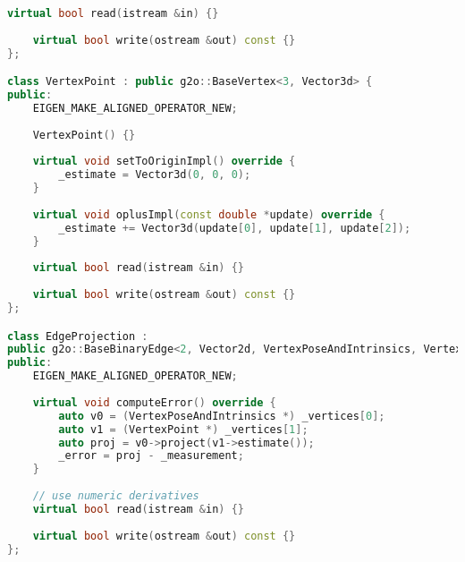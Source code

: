 \begin{lstlisting}[language=c++,caption=slambook2/ch9/bundle_adjustment_g2o.cpp(fragment)]
	virtual bool read(istream &in) {}
	
	virtual bool write(ostream &out) const {}
};

class VertexPoint : public g2o::BaseVertex<3, Vector3d> {
public:
	EIGEN_MAKE_ALIGNED_OPERATOR_NEW;
	
	VertexPoint() {}
	
	virtual void setToOriginImpl() override {
		_estimate = Vector3d(0, 0, 0);
	}
	
	virtual void oplusImpl(const double *update) override {
		_estimate += Vector3d(update[0], update[1], update[2]);
	}
	
	virtual bool read(istream &in) {}
	
	virtual bool write(ostream &out) const {}
};

class EdgeProjection :
public g2o::BaseBinaryEdge<2, Vector2d, VertexPoseAndIntrinsics, VertexPoint> {
public:
	EIGEN_MAKE_ALIGNED_OPERATOR_NEW;
	
	virtual void computeError() override {
		auto v0 = (VertexPoseAndIntrinsics *) _vertices[0];
		auto v1 = (VertexPoint *) _vertices[1];
		auto proj = v0->project(v1->estimate());
		_error = proj - _measurement;
	}
	
	// use numeric derivatives
	virtual bool read(istream &in) {}
	
	virtual bool write(ostream &out) const {}
};
\end{lstlisting}

